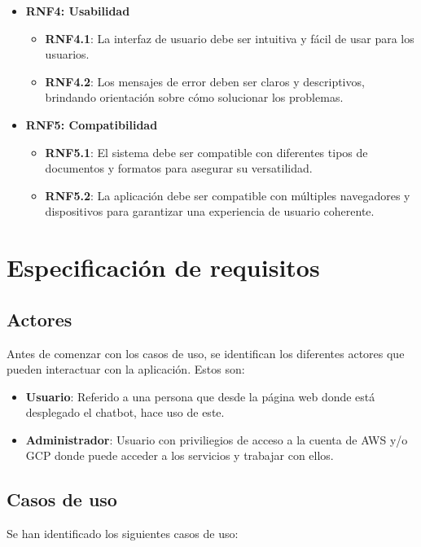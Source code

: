 \begin{itemize}
    \item \textbf{RNF4: Usabilidad}
    \begin{itemize}
        \item \textbf{RNF4.1}: La interfaz de usuario debe ser intuitiva y fácil de usar para los usuarios.
        \item \textbf{RNF4.2}: Los mensajes de error deben ser claros y descriptivos, brindando orientación sobre cómo solucionar los problemas.
    \end{itemize}
  
    \item \textbf{RNF5: Compatibilidad}
    \begin{itemize}
        \item \textbf{RNF5.1}: El sistema debe ser compatible con diferentes tipos de documentos y formatos para asegurar su versatilidad.
        \item \textbf{RNF5.2}: La aplicación debe ser compatible con múltiples navegadores y dispositivos para garantizar una experiencia de usuario coherente.
    \end{itemize}
\end{itemize}

\section{Especificación de requisitos}
\label{sec:Especificación de requisitos}

\subsection{Actores}
Antes de comenzar con los casos de uso, se identifican los diferentes actores que pueden interactuar con la aplicación. Estos son:
\begin{itemize}
    \item \textbf{Usuario}: Referido a una persona que desde la página web donde está desplegado el chatbot, hace uso de este.
    \item \textbf{Administrador}: Usuario con priviliegios de acceso a la cuenta de AWS y/o GCP donde puede acceder a los servicios y trabajar con ellos.
\end{itemize}

\subsection{Casos de uso}\label{casos_uso}

Se han identificado los siguientes casos de uso:

